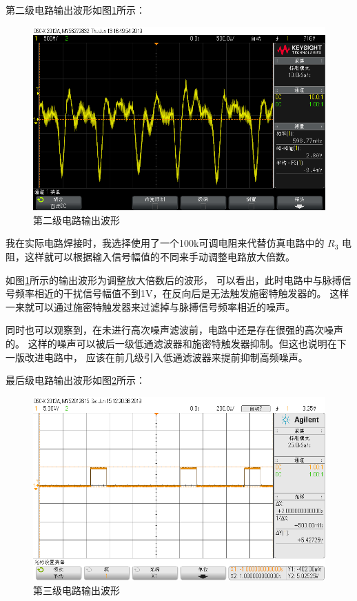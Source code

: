 \documentclass{article}
\begin{document}
\begin{spacing}{1.5}
    第二级电路输出波形如图\ref{fig:result3}所示：
    \begin{figure}[H]
        \centering
        \includegraphics[scale=0.3]{fig/result/result3.png}
        \caption{第二级电路输出波形}
        \label{fig:result3}
    \end{figure}

    我在实际电路焊接时，我选择使用了一个100k可调电阻来代替仿真电路中的
    $R_3$ 电阻，这样就可以根据输入信号幅值的不同来手动调整电路放大倍数。
    
    如图\ref{fig:result3}所示的输出波形为调整放大倍数后的波形，
    可以看出，此时电路中与脉搏信号频率相近的干扰信号幅值不到1V，在反向后是无法触发施密特触发器的。
    这样一来就可以通过施密特触发器来过滤掉与脉搏信号频率相近的噪声。
    
    同时也可以观察到，在未进行高次噪声滤波前，电路中还是存在很强的高次噪声的。
    这样的噪声可以被后一级低通滤波器和施密特触发器抑制。但这也说明在下一版改进电路中，
    应该在前几级引入低通滤波器来提前抑制高频噪声。
    
    最后级电路输出波形如图\ref{fig:result4}所示：
    \begin{figure}[H]
        \centering
        \includegraphics[scale=0.3]{fig/result/result4.png}
        \caption{第三级电路输出波形}
        \label{fig:result4}
    \end{figure}


\end{spacing}
\end{document}
